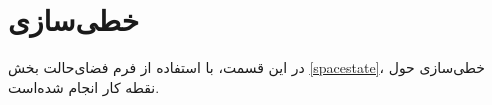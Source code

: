 \section{خطی‌سازی}\label{lin_SISO}
در این قسمت، با استفاده از فرم فضای‌حالت بخش 
\ref{spacestate}،
 خطی‌سازی حول نقطه کار انجام شده‌‌است. 
